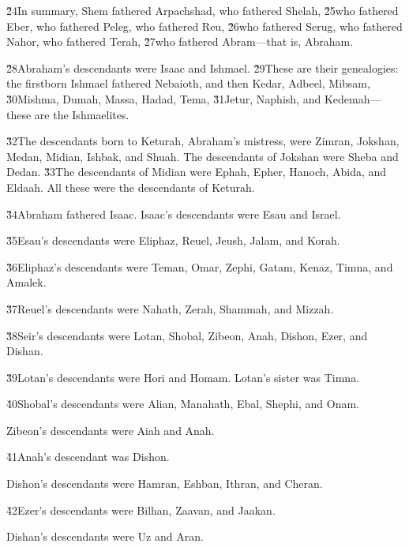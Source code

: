\v{24}In summary, Shem fathered Arpachshad, who fathered Shelah, \v{25}who fathered Eber, who fathered Peleg, who fathered Reu, \v{26}who fathered Serug, who fathered Nahor, who fathered Terah, \v{27}who fathered Abram---that is, Abraham.

\v{28}Abraham's descendants were Isaac and Ishmael. \v{29}These are their genealogies: the firstborn Ishmael fathered Nebaioth, and then Kedar, Adbeel, Mibsam, \v{30}Mishma, Dumah, Massa, Hadad, Tema, \v{31}Jetur, Naphish, and Kedemah---these are the Ishmaelites.

\v{32}The descendants born to Keturah, Abraham's mistress, were Zimran, Jokshan, Medan, Midian, Ishbak, and Shuah. The descendants of Jokshan were Sheba and Dedan. \v{33}The descendants of Midian were Ephah, Epher, Hanoch, Abida, and Eldaah. All these were the descendants of Keturah.

\v{34}Abraham fathered Isaac. Isaac's descendants were Esau and Israel.

\v{35}Esau's descendants were Eliphaz, Reuel, Jeush, Jalam, and Korah.

\v{36}Eliphaz's descendants were Teman, Omar, Zephi, Gatam, Kenaz, Timna, and Amalek.

\v{37}Reuel's descendants were Nahath, Zerah, Shammah, and Mizzah.

\v{38}Seir's descendants were Lotan, Shobal, Zibeon, Anah, Dishon, Ezer, and Dishan.

\v{39}Lotan's descendants were Hori and Homam. Lotan's sister was Timna.

\v{40}Shobal's descendants were Alian, Manahath, Ebal, Shephi, and Onam.

Zibeon's descendants were Aiah and Anah.

\v{41}Anah's descendant was Dishon.

Dishon's descendants were Hamran, Eshban, Ithran, and Cheran.

\v{42}Ezer's descendants were Bilhan, Zaavan, and Jaakan.

Dishan's descendants were Uz and Aran.


